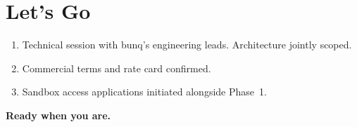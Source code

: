 
\section{Let's Go}

\begin{enumerate}
\item Technical session with bunq's engineering leads. Architecture jointly scoped.
\item Commercial terms and rate card confirmed.
\item Sandbox access applications initiated alongside Phase~1.
\end{enumerate}

\vspace{1cm}

\begin{center}
{\Large\textsf{\textbf{Ready when you are.}}}
\end{center}
